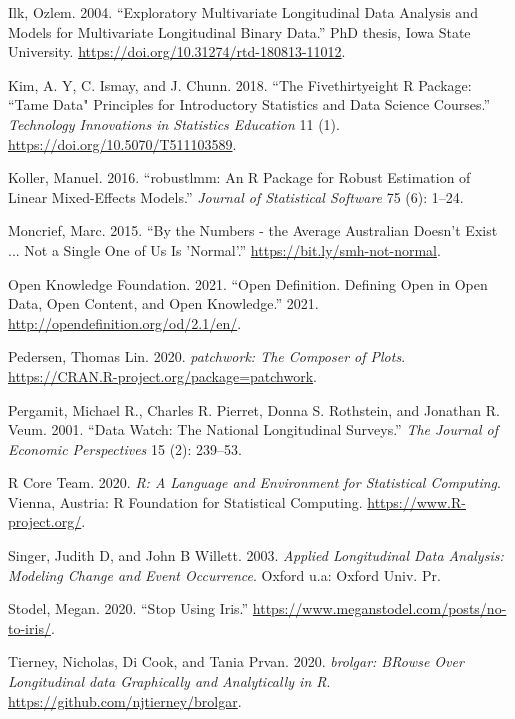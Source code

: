 \documentclass{article}
\begin{document}
\leavevmode\hypertarget{ref-ilk2004}{}%
Ilk, Ozlem. 2004. ``Exploratory Multivariate Longitudinal Data Analysis and Models for Multivariate Longitudinal Binary Data.'' PhD thesis, Iowa State University. \url{https://doi.org/10.31274/rtd-180813-11012}.

\leavevmode\hypertarget{ref-tamedata}{}%
Kim, A. Y, C. Ismay, and J. Chunn. 2018. ``The Fivethirtyeight R Package: ``Tame Data" Principles for Introductory Statistics and Data Science Courses.'' \emph{Technology Innovations in Statistics Education} 11 (1). \url{https://doi.org/10.5070/T511103589}.

\leavevmode\hypertarget{ref-KollerManuel2016rARP}{}%
Koller, Manuel. 2016. ``robustlmm: An R Package for Robust Estimation of Linear Mixed-Effects Models.'' \emph{Journal of Statistical Software} 75 (6): 1--24.

\leavevmode\hypertarget{ref-notaverage}{}%
Moncrief, Marc. 2015. ``By the Numbers - the Average Australian Doesn't Exist ... Not a Single One of Us Is 'Normal'.'' \url{https://bit.ly/smh-not-normal}.

\leavevmode\hypertarget{ref-opendata}{}%
Open Knowledge Foundation. 2021. ``Open Definition. Defining Open in Open Data, Open Content, and Open Knowledge.'' 2021. \url{http://opendefinition.org/od/2.1/en/}.

\leavevmode\hypertarget{ref-patchwork}{}%
Pedersen, Thomas Lin. 2020. \emph{patchwork: The Composer of Plots}. \url{https://CRAN.R-project.org/package=patchwork}.

\leavevmode\hypertarget{ref-MichaelRPergamit2001DWTN}{}%
Pergamit, Michael R., Charles R. Pierret, Donna S. Rothstein, and Jonathan R. Veum. 2001. ``Data Watch: The National Longitudinal Surveys.'' \emph{The Journal of Economic Perspectives} 15 (2): 239--53.

\leavevmode\hypertarget{ref-R}{}%
R Core Team. 2020. \emph{R: A Language and Environment for Statistical Computing}. Vienna, Austria: R Foundation for Statistical Computing. \url{https://www.R-project.org/}.

\leavevmode\hypertarget{ref-SingerJudithD2003Alda}{}%
Singer, Judith D, and John B Willett. 2003. \emph{Applied Longitudinal Data Analysis: Modeling Change and Event Occurrence}. Oxford u.a: Oxford Univ. Pr.

\leavevmode\hypertarget{ref-notiris}{}%
Stodel, Megan. 2020. ``Stop Using Iris.'' \url{https://www.meganstodel.com/posts/no-to-iris/}.

\leavevmode\hypertarget{ref-brolgar}{}%
Tierney, Nicholas, Di Cook, and Tania Prvan. 2020. \emph{brolgar: BRowse Over Longitudinal data Graphically and Analytically in R}. \url{https://github.com/njtierney/brolgar}.
\end{document}
